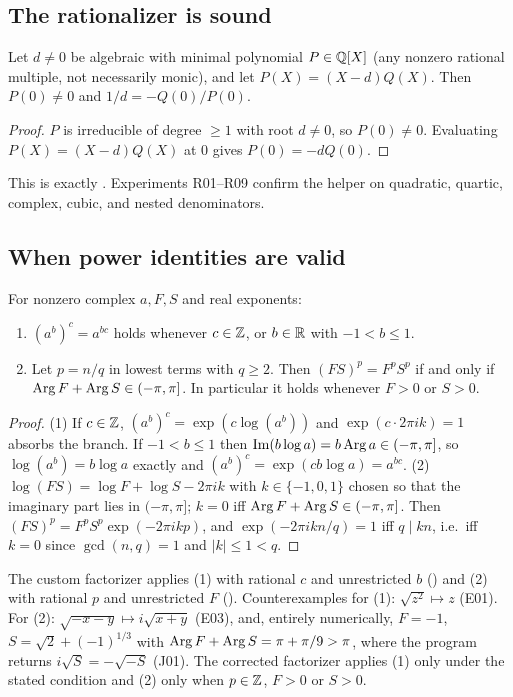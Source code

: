 \subsection{The rationalizer is sound}
\begin{proposition}\label{prop:rat}
Let $d\ne0$ be algebraic with minimal polynomial $P\in\mathbb{Q}[X]$ (any nonzero
rational multiple, not necessarily monic), and let $P(X)=(X-d)Q(X)$. Then
$P(0)\ne0$ and $1/d=-Q(0)/P(0)$.
\end{proposition}
\begin{proof}
$P$ is irreducible of degree $\ge1$ with root $d\ne0$, so $P(0)\ne0$. Evaluating
$P(X)=(X-d)Q(X)$ at $0$ gives $P(0)=-dQ(0)$.
\end{proof}
This is exactly . Experiments R01--R09 confirm the helper on
quadratic, quartic, complex, cubic, and nested denominators.

\subsection{When power identities are valid}
\begin{proposition}\label{prop:power}
For nonzero complex $a,F,S$ and real exponents:
\begin{enumerate}
\item $(a^b)^c=a^{bc}$ holds whenever $c\in\mathbb{Z}$, or $b\in\mathbb{R}$ with $-1<b\le1$.
\item Let $p=n/q$ in lowest terms with $q\ge2$. Then $(FS)^p=F^pS^p$ if and only
      if $\operatorname{Arg} F+\operatorname{Arg} S\in(-\pi,\pi]$. In particular it holds whenever $F>0$ or
      $S>0$.
\end{enumerate}
\end{proposition}
\begin{proof}
(1) If $c\in\mathbb{Z}$, $(a^b)^c=\exp(c\log(a^b))$ and $\exp(c\cdot 2\pi i k)=1$
absorbs the branch. If $-1<b\le1$ then $\operatorname{Im}(b\log a)=b\operatorname{Arg} a\in(-\pi,\pi]$,
so $\log(a^b)=b\log a$ exactly and $(a^b)^c=\exp(cb\log a)=a^{bc}$.
(2) $\log(FS)=\log F+\log S-2\pi ik$ with $k\in\{-1,0,1\}$ chosen so that the
imaginary part lies in $(-\pi,\pi]$; $k=0$ iff $\operatorname{Arg} F+\operatorname{Arg} S\in(-\pi,\pi]$. Then
$(FS)^p=F^pS^p\exp(-2\pi ikp)$, and $\exp(-2\pi ikn/q)=1$ iff $q\mid kn$, i.e.\
iff $k=0$ since $\gcd(n,q)=1$ and $|k|\le1<q$.
\end{proof}
The custom factorizer applies (1) with rational $c$ and unrestricted $b$
(\src{527--531}) and (2) with rational $p$ and unrestricted $F$
(). Counterexamples for (1): $\sqrt{z^2}\mapsto z$ (E01).
For (2): $\sqrt{-x-y}\mapsto i\sqrt{x+y}$ (E03), and, entirely numerically,
$F=-1$, $S=\sqrt2+(-1)^{1/3}$ with $\operatorname{Arg} F+\operatorname{Arg} S=\pi+\pi/9>\pi$, where the
program returns $i\sqrt S=-\sqrt{-S}$ (J01). The corrected factorizer applies
(1) only under the stated condition and (2) only when $p\in\mathbb{Z}$, $F>0$ or $S>0$.

